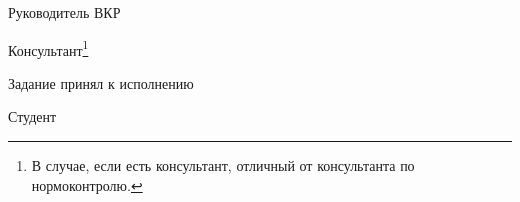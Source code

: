 \intervalS%

Руководитель ВКР \uline{\hspace*{0.1\textheight} \Supervisor}


\intervalS%

Консультант\footnote{В случае, если есть консультант, отличный от консультанта по нормоконтролю.}  \uline{\hspace*{0.1\textheight}\ConsultantExtra}


\intervalS%


Задание принял к исполнению \uline{\thesisStartDate}

\intervalS%

Студент \uline{\hspace*{0.1\textheight}  \Author}



